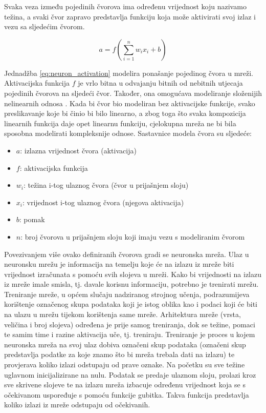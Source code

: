 Svaka veza između pojedinih čvorova ima određenu vrijednost koju nazivamo težina, a svaki čvor
zapravo predstavlja funkciju koja može aktivirati svoj izlaz i vezu sa sljedećim čvorom.

\begin{equation}
  \label{eq:neuron_activation}
  a = f\left(\sum_{i=1}^n w_i x_i + b\right)
\end{equation}

Jednadžba \eqref{eq:neuron_activation} modelira ponašanje pojedinog čvora u mreži. Aktivacijska
funkcija \( f \) je vrlo bitna u odvajanju bitnih od nebitnih utjecaja pojedinih čvorova na sljedeći
čvor. Također, ona omogućava modeliranje složenijih nelinearnih odnosa \cite{activation_fcn}.
Kada bi čvor bio modeliran
bez aktivacijske funkcije, svako preslikavanje koje bi činio bi bilo linearno, a zbog toga što
svaka kompozicija linearnih funkcija daje opet linearnu funkciju, cjelokupna mreža ne bi bila sposobna
modelirati kompleksnije odnose. Sastavnice modela čvora su sljedeće:

\begin{itemize}
  \item \( a \): izlazna vrijednost čvora (aktivacija)
  \item \( f \): aktivacijska funkcija
  \item \( w_i \): težina i-tog ulaznog čvora (čvor u prijašnjem sloju)
  \item \( x_i \): vrijednost i-tog ulaznog čvora (njegova aktivacija)
  \item \( b \): pomak
  \item \( n \): broj čvorova u prijašnjem sloju koji imaju vezu s modeliranim čvorom
\end{itemize}

Povezivanjem više ovako definiranih čvorova gradi se neuronska mreža. Ulaz u neuronsku mrežu 
je informacija na temelju koje će na izlazu iz mreže biti vrijednost izračunata s pomoću svih
slojeva u mreži. Kako bi vrijednosti na izlazu iz mreže imale smisla, tj. davale korisnu
informaciju, potrebno je trenirati mrežu. Treniranje mreže, u općem slučaju nadziranog strojnog
učenja, podrazumijeva korištenje označenog skupa podataka koji je istog oblika kao i podaci
koji će biti na ulazu u mrežu tijekom korištenja same mreže. Arhitektura mreže (vrsta, veličina
i broj slojeva) određena je prije samog treniranja, dok se težine, pomaci te samim time i 
razine aktivacija uče, tj. treniraju. Treniranje je proces u kojem neuronska mreža na svoj ulaz dobiva
označeni skup podataka (označeni skup predstavlja podatke za koje znamo što bi mreža trebala
dati na izlazu) te provjerava koliko izlazi odstupaju od prave oznake. Na početku su sve težine
uglavnom inicijalizirane na nulu. Podatak se predaje ulaznom sloju, prolazi kroz sve skrivene
slojeve te na izlazu mreža izbacuje određenu vrijednost koja se s očekivanom uspoređuje s pomoću
funkcije gubitka. Takva funkcija predstavlja koliko izlazi iz mreže odstupaju od očekivanih.

